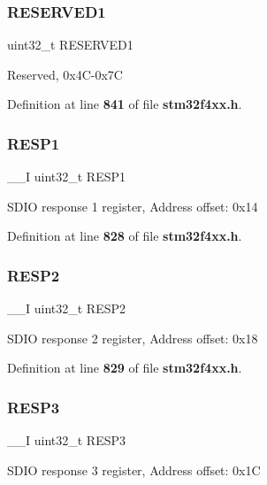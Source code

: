 \subsubsection{R\+E\+S\+E\+R\+V\+E\+D1}
{\footnotesize\ttfamily uint32\+\_\+t R\+E\+S\+E\+R\+V\+E\+D1}

Reserved, 0x4\+C-\/0x7C 

Definition at line \textbf{ 841} of file \textbf{ stm32f4xx.\+h}.

\mbox{\label{structSDIO__TypeDef_a7b0ee0dc541683266dfab6335abca891}} 
\subsubsection{R\+E\+S\+P1}
{\footnotesize\ttfamily \+\_\+\+\_\+I uint32\+\_\+t R\+E\+S\+P1}

S\+D\+IO response 1 register, Address offset\+: 0x14 

Definition at line \textbf{ 828} of file \textbf{ stm32f4xx.\+h}.

\mbox{\label{structSDIO__TypeDef_a4d99c78dffdb6e81e8f6b7abec263419}} 
\subsubsection{R\+E\+S\+P2}
{\footnotesize\ttfamily \+\_\+\+\_\+I uint32\+\_\+t R\+E\+S\+P2}

S\+D\+IO response 2 register, Address offset\+: 0x18 

Definition at line \textbf{ 829} of file \textbf{ stm32f4xx.\+h}.

\mbox{\label{structSDIO__TypeDef_a3da04fbdd44f48a1840e5e0a6295f3cf}} 
\subsubsection{R\+E\+S\+P3}
{\footnotesize\ttfamily \+\_\+\+\_\+I uint32\+\_\+t R\+E\+S\+P3}

S\+D\+IO response 3 register, Address offset\+: 0x1C 

